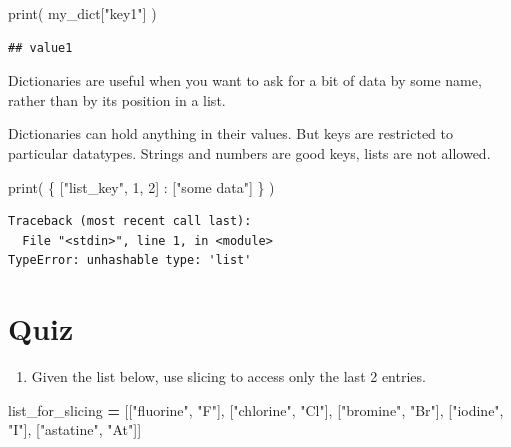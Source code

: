 \documentclass[]{book}
\newenvironment{Shaded}{\begin{snugshade}}{\end{snugshade}}
\newcommand{\BuiltInTok}[1]{#1}
\newcommand{\DecValTok}[1]{\textcolor[rgb]{0.00,0.00,0.81}{#1}}
\newcommand{\NormalTok}[1]{#1}
\newcommand{\OperatorTok}[1]{\textcolor[rgb]{0.81,0.36,0.00}{\textbf{#1}}}
\newcommand{\StringTok}[1]{\textcolor[rgb]{0.31,0.60,0.02}{#1}}
\providecommand{\tightlist}{%
  \setlength{\itemsep}{0pt}\setlength{\parskip}{0pt}}
\theoremstyle{definition}
\theoremstyle{definition}
\theoremstyle{definition}
\theoremstyle{remark}
\begin{document}
\begin{Shaded}
\begin{Highlighting}[]
\BuiltInTok{print}\NormalTok{( my_dict[}\StringTok{"key1"}\NormalTok{] )}
\end{Highlighting}
\end{Shaded}

\begin{verbatim}
## value1
\end{verbatim}

Dictionaries are useful when you want to ask for a bit of data by some
name, rather than by its position in a list.

Dictionaries can hold anything in their values. But keys are restricted
to particular datatypes. Strings and numbers are good keys, lists are
not allowed.

\begin{Shaded}
\begin{Highlighting}[]
\BuiltInTok{print}\NormalTok{( \{ [}\StringTok{"list_key"}\NormalTok{, }\DecValTok{1}\NormalTok{, }\DecValTok{2}\NormalTok{] : [}\StringTok{"some data"}\NormalTok{]  \} )}
\end{Highlighting}
\end{Shaded}

\begin{verbatim}
Traceback (most recent call last):
  File "<stdin>", line 1, in <module>
TypeError: unhashable type: 'list'
\end{verbatim}

\hypertarget{quiz-1}{%
\section{Quiz}\label{quiz-1}}

\begin{enumerate}
\def\labelenumi{\arabic{enumi}.}
\tightlist
\item
  Given the list below, use slicing to access only the last 2 entries.
\end{enumerate}

\begin{Shaded}
\begin{Highlighting}[]
\NormalTok{list_for_slicing }\OperatorTok{=}\NormalTok{ [[}\StringTok{"fluorine"}\NormalTok{, }\StringTok{"F"}\NormalTok{], }
\NormalTok{                    [}\StringTok{"chlorine"}\NormalTok{, }\StringTok{"Cl"}\NormalTok{], }
\NormalTok{                    [}\StringTok{"bromine"}\NormalTok{, }\StringTok{"Br"}\NormalTok{], }
\NormalTok{                    [}\StringTok{"iodine"}\NormalTok{, }\StringTok{"I"}\NormalTok{], }
\NormalTok{                    [}\StringTok{"astatine"}\NormalTok{, }\StringTok{"At"}\NormalTok{]]}
\end{Highlighting}
\end{Shaded}
\end{document}
